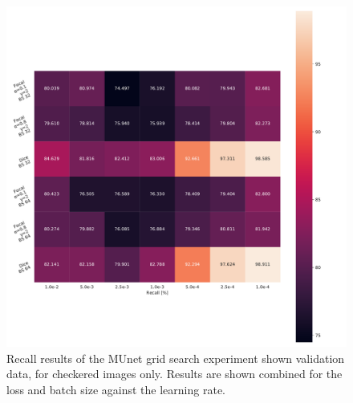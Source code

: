 \begin{figure}[H]
\begin{center}
    \includegraphics[width=\columnwidth]{imgs/munet_grid_heat_R_C.pdf}
    \caption{Recall results of the \ac{MUnet} grid search experiment shown validation data, for checkered images only. Results are shown combined for the loss and batch size against the learning rate.}
    \label{fig:munet_rc_heat}
\end{center}
\end{figure}


